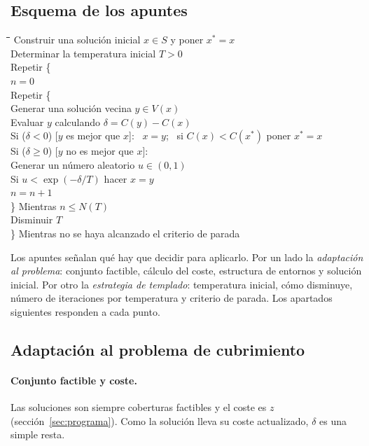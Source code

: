 \subsection{Esquema de los apuntes}

\begin{apuntes}
\begin{tabbing}
\quad\=\quad\=\quad\=\quad\=\kill
Construir una solución inicial $x\in S$ y poner $x^\ast=x$\\
Determinar la temperatura inicial $T>0$\\
Repetir \{\\
\> $n=0$\\
\> Repetir \{\\
\>\> Generar una solución vecina $y\in V(x)$\\
\>\> Evaluar $y$ calculando $\delta=C(y)-C(x)$\\
\>\> Si ($\delta<0$) [$y$ es mejor que $x$]: \ $x=y$; \ si $C(x)<C(x^\ast)$ poner $x^\ast=x$\\
\>\> Si ($\delta\ge 0$) [$y$ no es mejor que $x$]:\\
\>\>\> Generar un número aleatorio $u\in(0,1)$\\
\>\>\> Si $u<\exp(-\delta/T)$ hacer $x=y$\\
\>\> $n=n+1$\\
\> \} Mientras $n\le N(T)$\\
\> Disminuir $T$\\
\} Mientras no se haya alcanzado el criterio de parada
\end{tabbing}
\end{apuntes}

Los apuntes señalan qué hay que decidir para aplicarlo. Por un lado la \emph{adaptación al
problema}: conjunto factible, cálculo del coste, estructura de entornos y solución inicial.
Por otro la \emph{estrategia de templado}: temperatura inicial, cómo disminuye, número de
iteraciones por temperatura y criterio de parada. Los apartados siguientes responden a cada
punto.

\subsection{Adaptación al problema de cubrimiento}

\paragraph{Conjunto factible y coste.} Las soluciones son siempre coberturas factibles y el
coste es $z$ (sección~\ref{sec:programa}). Como la solución lleva su coste actualizado,
$\delta$ es una simple resta.

